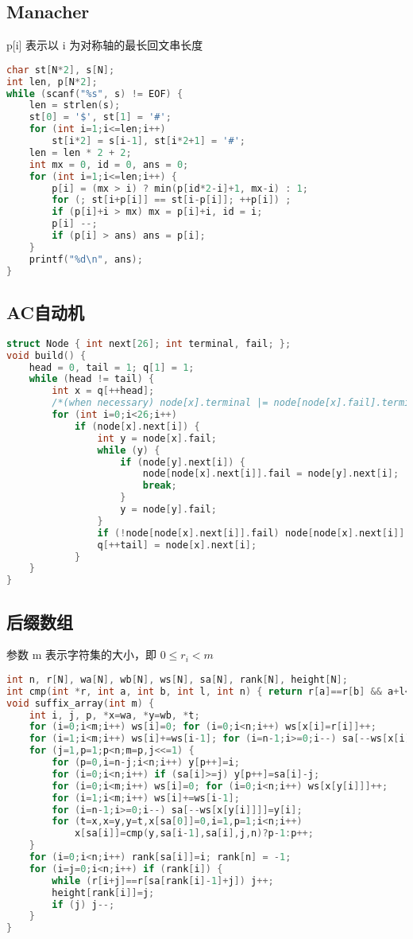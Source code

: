 \documentclass{article}
\begin{document}
\subsection{Manacher}
p[i] 表示以 i 为对称轴的最长回文串长度
\begin{lstlisting}[language=C++]
char st[N*2], s[N];
int len, p[N*2];
while (scanf("%s", s) != EOF) {
	len = strlen(s);
	st[0] = '$', st[1] = '#';
	for (int i=1;i<=len;i++)
		st[i*2] = s[i-1], st[i*2+1] = '#';
	len = len * 2 + 2;
	int mx = 0, id = 0, ans = 0;
	for (int i=1;i<=len;i++) {
		p[i] = (mx > i) ? min(p[id*2-i]+1, mx-i) : 1;
		for (; st[i+p[i]] == st[i-p[i]]; ++p[i]) ;
		if (p[i]+i > mx) mx = p[i]+i, id = i;
		p[i] --;
		if (p[i] > ans) ans = p[i];
	}
	printf("%d\n", ans);
}
\end{lstlisting}

\subsection{AC自动机}
\begin{lstlisting}[language=C++]
struct Node { int next[26]; int terminal, fail; };
void build() {
	head = 0, tail = 1; q[1] = 1;
	while (head != tail) {
		int x = q[++head];
		/*(when necessary) node[x].terminal |= node[node[x].fail].terminal; */
		for (int i=0;i<26;i++)
			if (node[x].next[i]) {
				int y = node[x].fail;
				while (y) {
					if (node[y].next[i]) {
						node[node[x].next[i]].fail = node[y].next[i];
						break;
					}
					y = node[y].fail;
				}
				if (!node[node[x].next[i]].fail) node[node[x].next[i]].fail = 1;
				q[++tail] = node[x].next[i];
			}
	}
}
\end{lstlisting}

\subsection{后缀数组}
参数 m 表示字符集的大小，即 $0 \leq r_i < m$ 
\begin{lstlisting}[language=C++]
int n, r[N], wa[N], wb[N], ws[N], sa[N], rank[N], height[N];
int cmp(int *r, int a, int b, int l, int n) { return r[a]==r[b] && a+l<n && b+l<n && r[a+l]==r[b+l]; }
void suffix_array(int m) {
	int i, j, p, *x=wa, *y=wb, *t;
	for (i=0;i<m;i++) ws[i]=0; for (i=0;i<n;i++) ws[x[i]=r[i]]++;
	for (i=1;i<m;i++) ws[i]+=ws[i-1]; for (i=n-1;i>=0;i--) sa[--ws[x[i]]]=i;
	for (j=1,p=1;p<n;m=p,j<<=1) {
		for (p=0,i=n-j;i<n;i++) y[p++]=i;
		for (i=0;i<n;i++) if (sa[i]>=j) y[p++]=sa[i]-j;
		for (i=0;i<m;i++) ws[i]=0; for (i=0;i<n;i++) ws[x[y[i]]]++;
		for (i=1;i<m;i++) ws[i]+=ws[i-1];
		for (i=n-1;i>=0;i--) sa[--ws[x[y[i]]]]=y[i];
		for (t=x,x=y,y=t,x[sa[0]]=0,i=1,p=1;i<n;i++)
			x[sa[i]]=cmp(y,sa[i-1],sa[i],j,n)?p-1:p++;
	}
	for (i=0;i<n;i++) rank[sa[i]]=i; rank[n] = -1;
	for (i=j=0;i<n;i++) if (rank[i]) {
		while (r[i+j]==r[sa[rank[i]-1]+j]) j++; 
		height[rank[i]]=j;
		if (j) j--; 
	}
}
\end{lstlisting}
\end{document}
